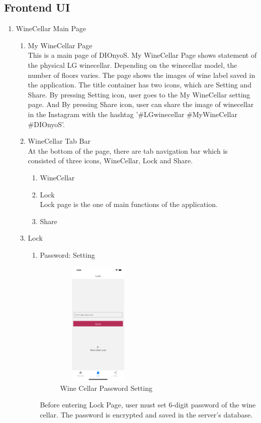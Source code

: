 \documentclass[sigconf, nonacm]{acmart}
\begin{document}
\begin {enumerate}
    \subsection{Frontend UI}
    \begin{enumerate}
        \item WineCellar Main Page
        \begin{enumerate}
            \item My WineCellar Page\\
            This is a main page of DIOnyoS. My WineCellar Page shows statement of the physical LG winecellar. Depending on the winecellar model, the number of floors varies. The page shows the images of wine label saved in the application. The title container has two icons, which are Setting and Share. By pressing Setting icon, user goes to the My WineCellar setting page. And By pressing Share icon, user can share the image of winecellar in the Instagram with the hashtag '\#LGwinecellar \#MyWineCellar \#DIOnyoS'.    
            \item WineCellar Tab Bar\\
            At the bottom of the page, there are tab navigation bar which is consisted of three icons, WineCellar, Lock and Share. 
            \begin{enumerate}
                \item WineCellar
                \item Lock\\
                Lock page is the one of main functions of the application. 
                \item Share
            \end{enumerate}
            \item Lock
            \begin{enumerate}
                \item Password: Setting\\
                \begin{figure}
                    \centering
                    \includegraphics[width=4cm, height=6cm]{2. WineCellarPasswdSetting.png}
                    \caption{Wine Cellar Password Setting}
                \end{figure}
                Before entering Lock Page, user must set 6-digit password of the wine cellar. The password is encrypted and saved in the server's database. 
                 

\end{enumerate}
\end{enumerate}
\end{enumerate}
\end{enumerate}
\end{document}
